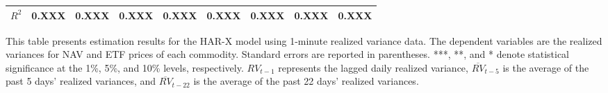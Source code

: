 \begin{landscape}
\begin{table}[htbp]
\begin{threeparttable}
\begin{tabular}{@{}lcccccccc@{}}
$R^2$ & 0.XXX & 0.XXX & 0.XXX & 0.XXX & 0.XXX & 0.XXX & 0.XXX & 0.XXX \\
\bottomrule
\end{tabular}
\begin{tablenotes}
\small
\item This table presents estimation results for the HAR-X model using 1-minute realized variance data. The dependent variables are the realized variances for NAV and ETF prices of each commodity. Standard errors are reported in parentheses. ***, **, and * denote statistical significance at the 1\%, 5\%, and 10\% levels, respectively. $RV_{t-1}$ represents the lagged daily realized variance, $\overline{RV}_{t-5}$ is the average of the past 5 days' realized variances, and $\overline{RV}_{t-22}$ is the average of the past 22 days' realized variances.
\end{tablenotes}
\end{threeparttable}
\end{table}
\end{landscape}


